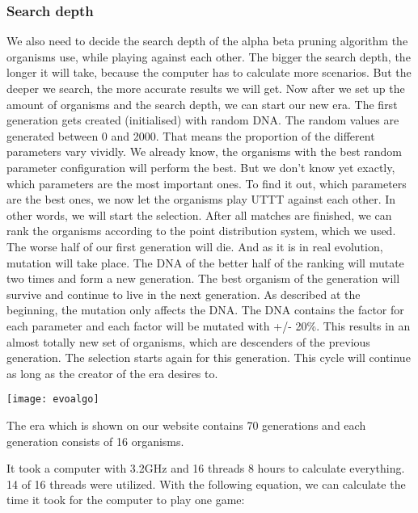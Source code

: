 \subsubsection{Search depth}
We also need to decide the search depth of the alpha beta pruning algorithm the organisms use, while playing against each other. The bigger the search depth, the longer it will take, because the computer has to calculate more scenarios. But the deeper we search, the more accurate results we will get. 
Now after we set up the amount of organisms and the search depth, we can start our new era. The first generation gets created (initialised) with random DNA. The random values are generated between 0 and 2000.
That means the proportion of the different parameters vary vividly. We already know, the organisms with the best random parameter configuration will perform the best. But we don't know yet exactly, which parameters are the most important ones. To find it out, which parameters are the best ones, we now let the organisms play \ac{UTTT} against each other. In other words, we will start the selection. After all matches are finished, we can rank the organisms according to the point distribution system, which we used. The worse half of our first generation will die. And as it is in real evolution, mutation will take place.
The DNA of the better half of the ranking will mutate two times and form a new generation. The best organism of the generation will survive and continue to live in the next generation.
As described at the beginning, the mutation only affects the DNA. The DNA contains the factor for each parameter and each factor will be mutated with +/- 20\%. This results in an almost totally new set of organisms, which are descenders of the previous generation. The selection starts again for this generation.
This cycle will continue as long as the creator of the era desires to. \\

\begin{fixedpic}
	\centering
	\texttt{[image: evoalgo]}
\end{fixedpic}


The era which is shown on our website contains 70 generations and each generation consists of 16 organisms.

It took a computer with 3.2GHz and 16 \acp{thread} 8 hours to calculate everything. 14 of 16 threads were utilized. With the following equation, we can calculate the time it took for the computer to play one game:

